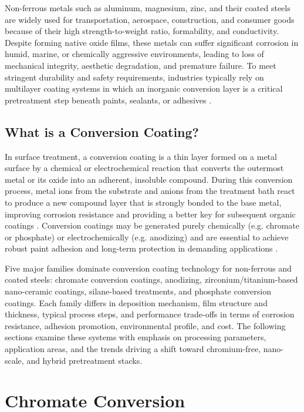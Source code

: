 \documentclass[12pt]{article}
\begin{document}
            Non-ferrous metals such as aluminum, magnesium, zinc, and their coated steels are widely used for transportation, aerospace, construction, and consumer goods because of their high strength-to-weight ratio, formability, and conductivity. Despite forming native oxide films, these metals can suffer significant corrosion in humid, marine, or chemically aggressive environments, leading to loss of mechanical integrity, aesthetic degradation, and premature failure. To meet stringent durability and safety requirements, industries typically rely on multilayer coating systems in which an inorganic conversion layer is a critical pretreatment step beneath paints, sealants, or adhesives \autocite{noauthor_conversion_2018}.

        \subsection{What is a Conversion Coating?}

            In surface treatment, a conversion coating is a thin layer formed on a metal surface by a chemical or electrochemical reaction that converts the outermost metal or its oxide into an adherent, insoluble compound. During this conversion process, metal ions from the substrate and anions from the treatment bath react to produce a new compound layer that is strongly bonded to the base metal, improving corrosion resistance and providing a better key for subsequent organic coatings \autocite{noauthor_conversion_2018}. Conversion coatings may be generated purely chemically (e.g. chromate or phosphate) or electrochemically (e.g. anodizing) and are essential to achieve robust paint adhesion and long-term protection in demanding applications \autocite{noauthor_conversion_2018}.

            Five major families dominate conversion coating technology for non-ferrous and coated steels: chromate conversion coatings, anodizing, zirconium/titanium-based nano-ceramic coatings, silane-based treatments, and phosphate conversion coatings. Each family differs in deposition mechanism, film structure and thickness, typical process steps, and performance trade-offs in terms of corrosion resistance, adhesion promotion, environmental profile, and cost. The following sections examine these systems with emphasis on processing parameters, application areas, and the trends driving a shift toward chromium-free, nano-scale, and hybrid pretreatment stacks.

    \section{Chromate Conversion}
\end{document}

